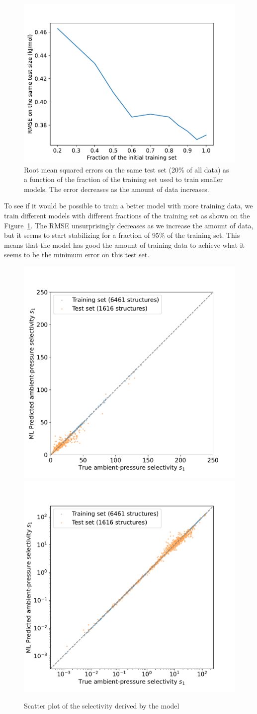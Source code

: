 \documentclass[main]{subfiles}
\begin{document}
\begin{figure}[ht]
  \centering
    \includegraphics[width=0.5\linewidth]{figures/4-ml/main/training_curve.pdf}
    \caption{ Root mean squared errors on the same test set (20\% of all data) as a function of the fraction of the training set used to train smaller models. The error decreases as the amount of data increases. }\label{fgr:training_curve}
  \end{figure}

To see if it would be possible to train a better model with more training data, we train different models with different fractions of the training set as shown on the Figure~\ref{fgr:training_curve}. The RMSE unsurprisingly decreases as we increase the amount of data, but it seems to start stabilizing for a fraction of 95\% of the training set. This means that the model has good the amount of training data to achieve what it seems to be the minimum error on this test set.

\begin{figure}[ht]
  \centering
    \includegraphics[width=0.48\linewidth]{figures/4-ml/SI_figure/Scatterplot_S1_prediction.pdf}
    \includegraphics[width=0.48\linewidth]{figures/4-ml/SI_figure/Scatterplot_S1_prediction_logscale.pdf}
    \caption{Scatter plot of the selectivity derived by the model}\label{fgr:S1_prediction}
  \end{figure}
\end{document}
